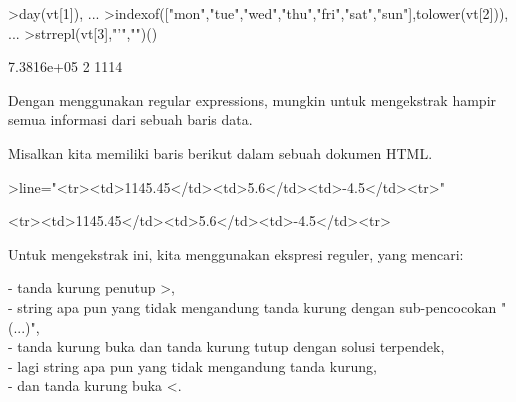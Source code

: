 \documentclass[a4paper,10pt]{article}
\begin{document}
\begin{eulernotebook}
\begin{eulercomment}
\begin{eulercomment}
\begin{eulercomment}
\begin{eulercomment}
\begin{eulercomment}
\begin{eulercomment}
\begin{eulerprompt}
>day(vt[1]),  ...
>indexof(["mon","tue","wed","thu","fri","sat","sun"],tolower(vt[2])),  ...
>strrepl(vt[3],"'","")()
\end{eulerprompt}
\begin{euleroutput}
  7.3816e+05
  2
  1114
\end{euleroutput}
\begin{eulercomment}
Dengan menggunakan regular expressions, mungkin untuk mengekstrak
hampir semua informasi dari sebuah baris data.

Misalkan kita memiliki baris berikut dalam sebuah dokumen HTML.
\end{eulercomment}
\begin{eulerprompt}
>line="<tr><td>1145.45</td><td>5.6</td><td>-4.5</td><tr>"
\end{eulerprompt}
\begin{euleroutput}
  <tr><td>1145.45</td><td>5.6</td><td>-4.5</td><tr>
\end{euleroutput}
\begin{eulercomment}
Untuk mengekstrak ini, kita menggunakan ekspresi reguler, yang
mencari:

- tanda kurung penutup \textgreater{},\\
- string apa pun yang tidak mengandung tanda kurung dengan
sub-pencocokan "(...)",\\
- tanda kurung buka dan tanda kurung tutup dengan solusi terpendek,\\
- lagi string apa pun yang tidak mengandung tanda kurung,\\
- dan tanda kurung buka \textless{}.


\end{eulercomment}
\end{eulercomment}
\end{eulercomment}
\end{eulercomment}
\end{eulercomment}
\end{eulercomment}
\end{eulercomment}
\end{eulernotebook}
\end{document}
